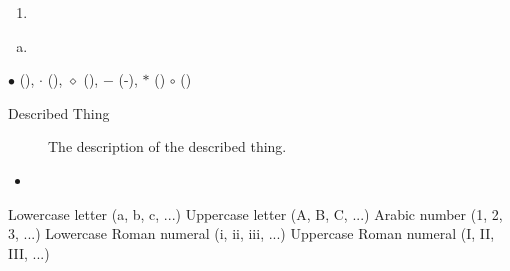 \usepackage{enumerate}


\begin{enumerate}[I]  
\item
\end{enumerate}

\begin{enumerate}[(a)]%
\item
\end{enumerate}

\renewcommand{\labelitemi}{$\bullet$}
\renewcommand{\labelitemii}{$\cdot$}
\renewcommand{\labelitemiii}{$\diamond$}

$\bullet$ (\bullet), 
$\cdot$ (\cdot), 
$\diamond$ (\diamond), 
$-$ (-), 
$\ast$ (\ast)  
$\circ$ (\circ)

\renewcommand{\labelitemiv}{$\ast$}

\begin{description}
\item[Described Thing] The description of the described thing.
\end{description}

\begin{itemize}\itemsep2pt
\item
\end{itemize}

\alph	Lowercase letter (a, b, c, ...)
\Alph	Uppercase letter (A, B, C, ...)
\arabic	Arabic number (1, 2, 3, ...)
\roman	Lowercase Roman numeral (i, ii, iii, ...)
\Roman	Uppercase Roman numeral (I, II, III, ...)

